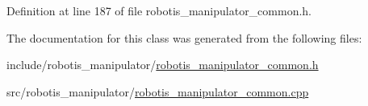 Definition at line 187 of file robotis\+\_\+manipulator\+\_\+common.\+h.



The documentation for this class was generated from the following files\+:\begin{DoxyCompactItemize}
\item 
include/robotis\+\_\+manipulator/\hyperlink{robotis__manipulator__common_8h}{robotis\+\_\+manipulator\+\_\+common.\+h}\item 
src/robotis\+\_\+manipulator/\hyperlink{robotis__manipulator__common_8cpp}{robotis\+\_\+manipulator\+\_\+common.\+cpp}\end{DoxyCompactItemize}
